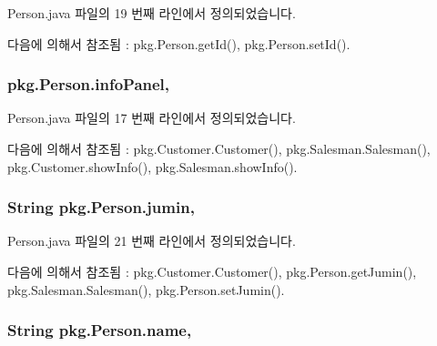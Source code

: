 Person.\+java 파일의 19 번째 라인에서 정의되었습니다.



다음에 의해서 참조됨 \+:  pkg.\+Person.\+get\+Id(), pkg.\+Person.\+set\+Id().

\subsubsection[{\texorpdfstring{info\+Panel}{infoPanel}}]{ pkg.\+Person.\+info\+Panel\hspace{0.3cm}{\ttfamily [protected]}, {\ttfamily [inherited]}}\hypertarget{classpkg_1_1_person_a4a1890f00be07d1bc4e3e9df16425210}{}\label{classpkg_1_1_person_a4a1890f00be07d1bc4e3e9df16425210}


Person.\+java 파일의 17 번째 라인에서 정의되었습니다.



다음에 의해서 참조됨 \+:  pkg.\+Customer.\+Customer(), pkg.\+Salesman.\+Salesman(), pkg.\+Customer.\+show\+Info(), pkg.\+Salesman.\+show\+Info().

\subsubsection[{\texorpdfstring{jumin}{jumin}}]{\setlength{\rightskip}{0pt plus 5cm}String pkg.\+Person.\+jumin\hspace{0.3cm}{\ttfamily [protected]}, {\ttfamily [inherited]}}\hypertarget{classpkg_1_1_person_aef72766ac67a0af8074b513d00c523f8}{}\label{classpkg_1_1_person_aef72766ac67a0af8074b513d00c523f8}


Person.\+java 파일의 21 번째 라인에서 정의되었습니다.



다음에 의해서 참조됨 \+:  pkg.\+Customer.\+Customer(), pkg.\+Person.\+get\+Jumin(), pkg.\+Salesman.\+Salesman(), pkg.\+Person.\+set\+Jumin().

\subsubsection[{\texorpdfstring{name}{name}}]{\setlength{\rightskip}{0pt plus 5cm}String pkg.\+Person.\+name\hspace{0.3cm}{\ttfamily [protected]}, {\ttfamily [inherited]}}\hypertarget{classpkg_1_1_person_a37fd1fe3cf039df98ffca54df6002bb6}{}\label{classpkg_1_1_person_a37fd1fe3cf039df98ffca54df6002bb6}


